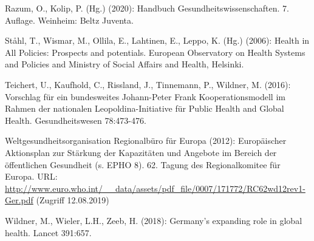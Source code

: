 \documentclass{article}
\begin{document}
Razum, O., Kolip, P. (Hg.) (2020): Handbuch Gesundheitswissenschaften. 7. Auflage. Weinheim: Beltz Juventa.


Ståhl, T., Wismar, M., Ollila, E., Lahtinen, E., Leppo, K. (Hg.) (2006): Health in All Policies: Prospects and potentials. European Observatory on Health Systems and Policies and Ministry of Social Affairs and Health, Helsinki.


Teichert, U., Kaufhold, C., Rissland, J., Tinnemann, P., Wildner, M. (2016): Vorschlag für ein bundesweites Johann-Peter Frank Kooperationsmodell im Rahmen der nationalen Leopoldina-Initiative für Public Health and Global Health. Gesundheitswesen 78:473-476.


Weltgesundheitsorganisation Regionalbüro für Europa (2012): Europäischer Aktionsplan zur Stärkung der Kapazitäten und Angebote im Bereich der öffentlichen Gesundheit (s. EPHO 8). 62. Tagung des Regionalkomitee für Europa. URL: \href{http://www.euro.who.int/__data/assets/pdf_file/0007/171772/RC62wd12rev1-Ger.pdf}{http://www.euro.who.int/\_\_data/assets/pdf\_file/0007/171772/RC62wd12rev1-Ger.pdf} (Zugriff 12.08.2019)


Wildner, M., Wieler, L.H., Zeeb, H. (2018): Germany’s expanding role in global health. Lancet 391:657. 
\end{document}
